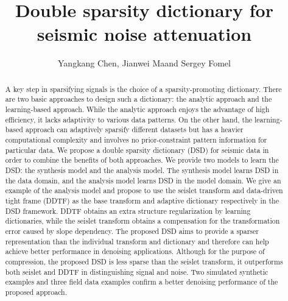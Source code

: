\title{Double sparsity dictionary for seismic noise attenuation}

\renewcommand{\thefootnote}{\fnsymbol{footnote}}
\author{Yangkang Chen\footnotemark[1], Jianwei Ma\footnotemark[2] and Sergey Fomel\footnotemark[1]}


\address{
\footnotemark[1]Bureau of Economic Geology \\
John A. and Katherine G. Jackson School of Geosciences \\
The University of Texas at Austin \\
University Station, Box X \\
Austin, TX 78713-8924 \\
ykchen@utexas.edu \& sergey.fomel@beg.utexas.edu \\
\footnotemark[2] Department of Mathematics \\
Harbin Institute of Technology \\
Harbin, China \\
jma@hit.edu.cn
}


\maketitle

\begin{abstract}
A key step in sparsifying signals is the choice of a sparsity-promoting dictionary. There are two basic approaches to design such a dictionary: the analytic approach and the learning-based approach. While the analytic approach enjoys the advantage of high efficiency, it lacks adaptivity to various data patterns. On the other hand, the learning-based approach can adaptively sparsify different datasets but has a heavier computational complexity and involves no prior-constraint pattern information for particular data. We propose a double sparsity dictionary (DSD) for seismic data in order to combine the benefits of both approaches. We provide two models to learn the DSD: the synthesis model and the analysis model. The synthesis model learns DSD in the data domain, and the analysis model learns DSD in the model domain. We give an example of the analysis model and propose to use the seislet transform and data-driven tight frame (DDTF) as the base transform and adaptive dictionary respectively in the DSD framework.  DDTF obtains an extra structure regularization by learning dictionaries, while the seislet transform obtains a compensation for the transformation error caused by slope dependency. The proposed DSD aims to provide a sparser representation than the individual transform and dictionary and therefore can help achieve better performance in denoising applications. Although for the purpose of compression, the proposed DSD is less sparse than the seislet transform, it outperforms both seislet and DDTF in distinguishing signal and noise. Two simulated synthetic examples and three field data examples confirm a better denoising performance of the proposed approach.
\end{abstract}


